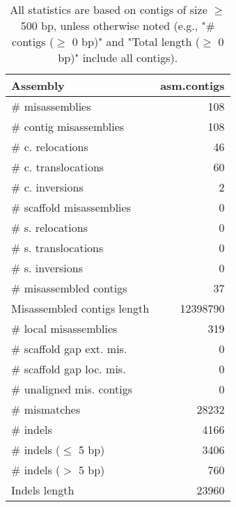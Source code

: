 \documentclass[12pt,a4paper]{article}
\begin{document}
\begin{table}[ht]
\begin{center}
\caption{All statistics are based on contigs of size $\geq$ 500 bp, unless otherwise noted (e.g., "\# contigs ($\geq$ 0 bp)" and "Total length ($\geq$ 0 bp)" include all contigs).}
\begin{tabular}{|l*{1}{|r}|}
\hline
Assembly & asm.contigs \\ \hline
\# misassemblies & 108 \\ \hline
\hspace{2mm}\# contig misassemblies & 108 \\ \hline
\hspace{5mm}\# c. relocations & 46 \\ \hline
\hspace{5mm}\# c. translocations & 60 \\ \hline
\hspace{5mm}\# c. inversions & 2 \\ \hline
\hspace{2mm}\# scaffold misassemblies & 0 \\ \hline
\hspace{5mm}\# s. relocations & 0 \\ \hline
\hspace{5mm}\# s. translocations & 0 \\ \hline
\hspace{5mm}\# s. inversions & 0 \\ \hline
\# misassembled contigs & 37 \\ \hline
Misassembled contigs length & 12398790 \\ \hline
\# local misassemblies & 319 \\ \hline
\# scaffold gap ext. mis. & 0 \\ \hline
\# scaffold gap loc. mis. & 0 \\ \hline
\# unaligned mis. contigs & 0 \\ \hline
\# mismatches & 28232 \\ \hline
\# indels & 4166 \\ \hline
\hspace{5mm}\# indels ($\leq$ 5 bp) & 3406 \\ \hline
\hspace{5mm}\# indels ($>$ 5 bp) & 760 \\ \hline
Indels length & 23960 \\ \hline
\end{tabular}
\end{center}
\end{table}
\end{document}
